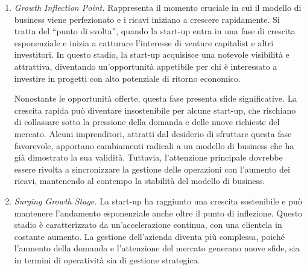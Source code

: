 \begin{enumerate}
    Questa fase può durare dai tre ai quattro anni e, di solito, i ricavi sono limitati. Per coprire le spese, gli imprenditori spesso utilizzano fondi propri, pratica conosciuta come bootstrapping. Tuttavia, alcune insidie possono compromettere il successo della start-up anche in questo stadio. Spesso gli imprenditori, trovandosi senza entrate sufficienti per coprire le spese personali, concentrano i propri sforzi sulla preparazione di presentazioni elaborate per attirare investitori, un’attività che può essere dispendiosa in termini di tempo ed energie. In aggiunta, talvolta si verificano investimenti eccessivi in costose campagne di marketing e vendite, oppure un’eccessiva rigidità nei confronti del prodotto, che limita la capacità di adattarsi ai cambiamenti del mercato. La chiave di successo in questa fase è la flessibilità e l’apertura al miglioramento continuo.

    \item \textit{Growth Inflection Point.} Rappresenta il momento cruciale in cui il modello di business viene perfezionato e i ricavi iniziano a crescere rapidamente. Si tratta del “punto di svolta”, quando la start-up entra in una fase di crescita esponenziale e inizia a catturare l’interesse di venture capitalist e altri investitori. In questo stadio, la start-up acquisisce una notevole visibilità e attrattiva, diventando un’opportunità appetibile per chi è interessato a investire in progetti con alto potenziale di ritorno economico.

    Nonostante le opportunità offerte, questa fase presenta sfide significative. La crescita rapida può diventare insostenibile per alcune start-up, che rischiano di collassare sotto la pressione della domanda e delle nuove richieste del mercato. Alcuni imprenditori, attratti dal desiderio di sfruttare questa fase favorevole, apportano cambiamenti radicali a un modello di business che ha già dimostrato la sua validità. Tuttavia, l’attenzione principale dovrebbe essere rivolta a sincronizzare la gestione delle operazioni con l’aumento dei ricavi, mantenendo al contempo la stabilità del modello di business.

    \item \textit{Surging Growth Stage.} La start-up ha raggiunto una crescita sostenibile e può mantenere l’andamento esponenziale anche oltre il punto di inflezione. Questo stadio è caratterizzato da un’accelerazione continua, con una clientela in costante aumento. La gestione dell’azienda diventa più complessa, poiché l’aumento della domanda e l’attenzione del mercato generano nuove sfide, sia in termini di operatività sia di gestione strategica.


\end{enumerate}
